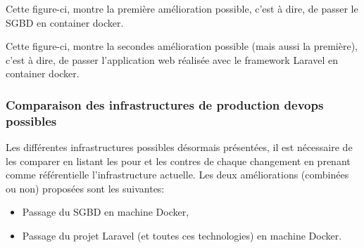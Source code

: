 \documentclass[
    iai, %
    il, %
]{heig-tb}
\begin{document}
Cette figure-ci, montre la première amélioration possible, c'est à dire, de passer le SGBD en container docker.

Cette figure-ci, montre la secondes amélioration possible (mais aussi la première), c'est à dire, de passer l'application web réalisée avec le framework Laravel en container docker.

\subsubsection{Comparaison des infrastructures de production devops possibles}
Les différentes infrastructures possibles désormais présentées, il est nécessaire de les comparer en listant les pour et les contres de chaque changement en prenant comme référentielle l'infrastructure actuelle.
Les deux améliorations (combinées ou non) proposées sont les suivantes:
\begin{itemize}
    \item Passage du SGBD en machine Docker,
    \item Passage du projet Laravel (et toutes ces technologies) en machine Docker.
\end{itemize}
\end{document}
